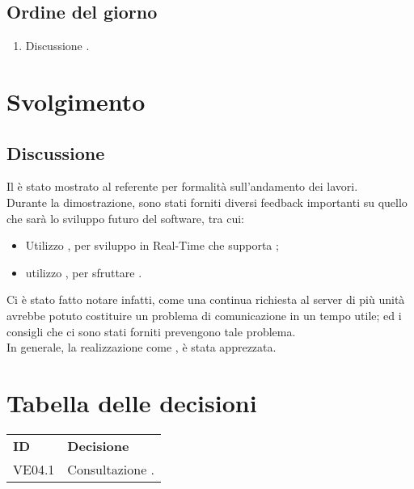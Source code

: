 \documentclass[]{article}
\begin{document}
	\subsection{Ordine del giorno}
	\begin{enumerate}
		\item Discussione .
	\end{enumerate}
	\newpage	
	\section{Svolgimento}
	
	
	\subsection{Discussione }
	Il  è stato mostrato al referente per formalità sull'andamento dei lavori. \\
	Durante la dimostrazione, sono stati forniti diversi feedback importanti su quello che sarà lo sviluppo futuro del software, tra cui:
	\begin{itemize}
		\item Utilizzo , per sviluppo in Real-Time che supporta ;
		\item utilizzo , per sfruttare .\\
	\end{itemize}
	
	Ci è stato fatto notare infatti, come una continua richiesta al server di più unità avrebbe potuto costituire un problema di comunicazione in un tempo utile; ed i consigli che ci sono stati forniti prevengono tale problema. \\
	In generale, la realizzazione come , è stata apprezzata.
	
	
	
	\newpage
	
	\section{Tabella delle decisioni}
	
	\begin{table} [h!]
		\begin{center}
			\begin{tabular} { m{2cm} m{14cm} }
				\rowcolor{lightgray}
				\textbf{ID} & \textbf{Decisione}\\
				VE04.1 & Consultazione \glock{Atmosphere}.\\
				
			\end{tabular}
		\end{center}
	\end{table}
\end{document}
